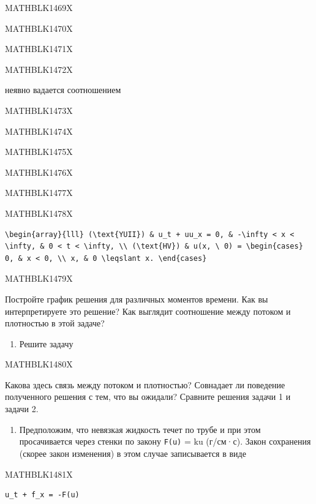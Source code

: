 \documentclass[
  ukrainian,
]{article}
\providecommand{\tightlist}{%
  \setlength{\itemsep}{0pt}\setlength{\parskip}{0pt}}
\begin{document}
MATHBLK1469X

MATHBLK1470X

MATHBLK1471X

MATHBLK1472X

неявно вадается соотношением

MATHBLK1473X

MATHBLK1474X

MATHBLK1475X

MATHBLK1476X

MATHBLK1477X

MATHBLK1478X

\begin{verbatim}
\begin{array}{lll} (\text{YUII}) & u_t + uu_x = 0, & -\infty < x < \infty, & 0 < t < \infty, \\ (\text{HV}) & u(x, \ 0) = \begin{cases} 0, & x < 0, \\ x, & 0 \leqslant x. \end{cases}
\end{verbatim}

MATHBLK1479X

Постройте график решения для различных моментов времени. Как вы
интерпретируете это решение? Как выглядит соотношение между потоком и
плотностью в этой задаче?

\begin{enumerate}
\def\labelenumi{\arabic{enumi}.}
\setcounter{enumi}{1}
\tightlist
\item
  Решите задачу
\end{enumerate}

MATHBLK1480X

Какова здесь связь между потоком и плотностью? Совнадает ли поведение
полученного решения с тем, что вы ожидали? Сравните решения задачи 1 и
задачи 2.

\begin{enumerate}
\def\labelenumi{\arabic{enumi}.}
\setcounter{enumi}{2}
\tightlist
\item
  Предположим, что невязкая жидкость течет по трубе и при этом
  просачивается через стенки по закону \texttt{F(u)} = ku (г/см·с).
  Закон сохранения (скорее закон изменения) в этом случае записывается в
  виде
\end{enumerate}

MATHBLK1481X

\begin{verbatim}
u_t + f_x = -F(u)
\end{verbatim}
\end{document}
